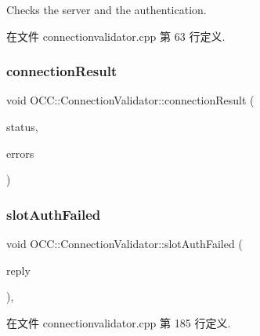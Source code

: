 Checks the server and the authentication. 



在文件 connectionvalidator.\+cpp 第 63 行定义.

\mbox{\label{class_o_c_c_1_1_connection_validator_a5d88b8ad31fa61ce5f16a9ac0f005ff3}} 
\subsubsection{\texorpdfstring{connection\+Result}{connectionResult}}
{\footnotesize\ttfamily void O\+C\+C\+::\+Connection\+Validator\+::connection\+Result (\begin{DoxyParamCaption}\item[{\hyperlink{class_o_c_c_1_1_connection_validator_a8f1192e5d8ff687dbf93faf38af67f8b}{Connection\+Validator\+::\+Status}}]{status,  }\item[{Q\+String\+List}]{errors }\end{DoxyParamCaption})\hspace{0.3cm}{\ttfamily [signal]}}

\mbox{\label{class_o_c_c_1_1_connection_validator_a1ccc64e4984f4573df3d341e3fa3c6fd}} 
\subsubsection{\texorpdfstring{slot\+Auth\+Failed}{slotAuthFailed}}
{\footnotesize\ttfamily void O\+C\+C\+::\+Connection\+Validator\+::slot\+Auth\+Failed (\begin{DoxyParamCaption}\item[{Q\+Network\+Reply $\ast$}]{reply }\end{DoxyParamCaption})\hspace{0.3cm}{\ttfamily [protected]}, {\ttfamily [slot]}}



在文件 connectionvalidator.\+cpp 第 185 行定义.

